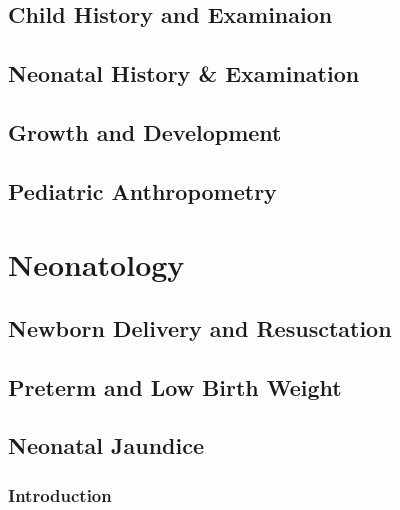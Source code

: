 \documentclass[
  letterpaper,
  DIV=11,
  numbers=noendperiod]{scrreprt}
\begin{document}
\hypertarget{child-history-and-examinaion}{%
\chapter{Child History and
Examinaion}\label{child-history-and-examinaion}}

\hypertarget{neonatal-history-examination}{%
\chapter{Neonatal History \&
Examination}\label{neonatal-history-examination}}


\hypertarget{growth-and-development}{%
\chapter{Growth and Development}\label{growth-and-development}}


\hypertarget{pediatric-anthropometry}{%
\chapter{Pediatric Anthropometry}\label{pediatric-anthropometry}}

\part{{Neonatology}}

\hypertarget{newborn-delivery-and-resusctation}{%
\chapter{Newborn Delivery and
Resusctation}\label{newborn-delivery-and-resusctation}}

\hypertarget{preterm-and-low-birth-weight}{%
\chapter{Preterm and Low Birth
Weight}\label{preterm-and-low-birth-weight}}

\hypertarget{neonatal-jaundice}{%
\chapter{Neonatal Jaundice}\label{neonatal-jaundice}}

\hypertarget{introduction}{%
\section{Introduction}\label{introduction}}
\end{document}
